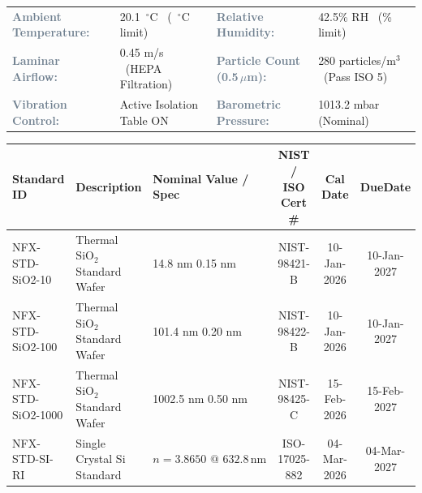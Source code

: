 \documentclass[10pt,a4paper]{scrartcl}
\newcommand{\fieldlabel}[1]{\textcolor{SlateGrey}{\small\bfseries #1}}
\newcommand{\fieldval}[1]{{\small #1}}
\begin{document}
\vspace{1pt}

\begin{tcolorbox}[sectionbox, title={\faWind\ SECTION 2: ENVIRONMENTAL MONITORING DURING CALIBRATION}]
\small
\begin{tabularx}{\textwidth}{@{}X X X X@{}}
  \fieldlabel{Ambient Temperature:} & \fieldval{20.1~$^\circ$C ~(\textpm 0.3~$^\circ$C limit)} & 
  \fieldlabel{Relative Humidity:} & \fieldval{42.5\% RH ~(\textpm 3.0\% limit)} \\
  \fieldlabel{Laminar Airflow:} & \fieldval{0.45 m/s ~(HEPA Filtration)} & 
  \fieldlabel{Particle Count (0.5\,\ensuremath{\mu}m):} & \fieldval{280 particles/m$^3$ ~(Pass ISO 5)} \\
  \fieldlabel{Vibration Control:} & \fieldval{Active Isolation Table ON} & 
  \fieldlabel{Barometric Pressure:} & \fieldval{1013.2 mbar (Nominal)} \\
\end{tabularx}
\end{tcolorbox}

\vspace{1pt}

\begin{tcolorbox}[sectionbox, title={\faBookmark\ SECTION 3: TRACEABLE CALIBRATION REFERENCE STANDARDS}]
\small
\begin{tabularx}{\textwidth}{@{}l X l c c c@{}}
  \toprule
  \textbf{Standard ID} & \textbf{Description} & \textbf{Nominal Value / Spec} & \textbf{NIST / ISO Cert \#} & \textbf{Cal Date} & \textbf{DueDate} \\
  \midrule
  \rowcolor{TableAlt}
  NFX-STD-SiO2-10 & Thermal $\text{SiO}_2$ Standard Wafer & 14.8 nm \textpm{} 0.15 nm & NIST-98421-B & 10-Jan-2026 & 10-Jan-2027 \\
  NFX-STD-SiO2-100 & Thermal $\text{SiO}_2$ Standard Wafer & 101.4 nm \textpm{} 0.20 nm & NIST-98422-B & 10-Jan-2026 & 10-Jan-2027 \\
  \rowcolor{TableAlt}
  NFX-STD-SiO2-1000 & Thermal $\text{SiO}_2$ Standard Wafer & 1002.5 nm \textpm{} 0.50 nm & NIST-98425-C & 15-Feb-2026 & 15-Feb-2027 \\
  NFX-STD-SI-RI & Single Crystal Si Standard & $n = 3.8650 \text{ @ } 632.8\,\text{nm}$ & ISO-17025-882 & 04-Mar-2026 & 04-Mar-2027 \\
  \bottomrule
\end{tabularx}
\end{tcolorbox}
\end{document}
